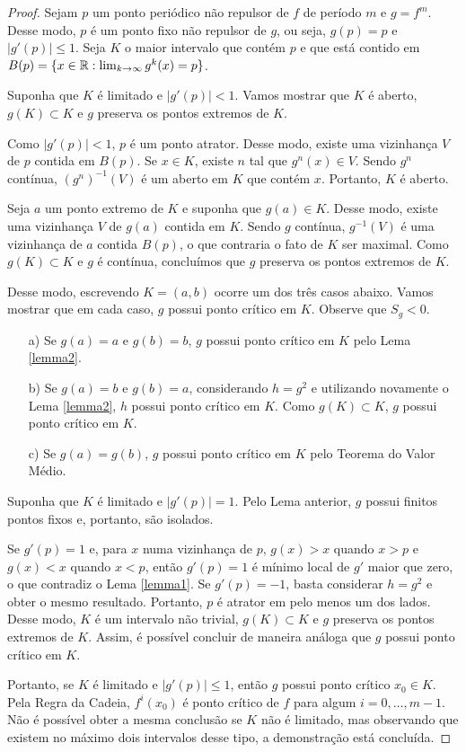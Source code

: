 \begin{proof}
Sejam $p$ um ponto periódico não repulsor de $f$ de período $m$ e $g = f^m$. Desse modo, $p$ é um ponto fixo não repulsor de $g$, ou seja, $g(p) = p$ e $|g'(p)| \leq 1$. Seja $K$ o maior intervalo que contém $p$ e que está contido em $B(p) = \{ x \in \mathbb{R} : \lim_{k \to \infty} g^k(x) = p \}$.

Suponha que $K$ é limitado e $|g'(p)| < 1$. Vamos mostrar que $K$ é aberto, $g(K) \subset K$ e $g$ preserva os pontos extremos de $K$.

Como $|g'(p)| < 1$, $p$ é um ponto atrator. Desse modo, existe uma vizinhança $V$ de $p$ contida em $B(p)$. Se $x \in K$, existe $n$ tal que $g^n(x) \in V$. Sendo $g^n$ contínua, $(g^n)^{-1}(V)$ é um aberto em $K$ que contém $x$. Portanto, $K$ é aberto.

Seja $a$ um ponto extremo de $K$ e suponha que $g(a) \in K$. Desse modo, existe uma vizinhança $V$ de $g(a)$ contida em $K$. Sendo $g$ contínua, $g^{-1}(V)$ é uma vizinhança de $a$ contida $B(p)$, o que contraria o fato de $K$ ser maximal. Como $g(K) \subset K$ e $g$ é contínua, concluímos que $g$ preserva os pontos extremos de $K$.

        Desse modo, escrevendo $K = (a, b)$ ocorre um dos três casos abaixo. Vamos mostrar que em cada caso, $g$ possui ponto crítico em $K$. Observe que $S_g < 0$.

\begin{enumerate}
\item[a)] Se $g(a) = a$ e $g(b) = b$, $g$ possui ponto crítico em $K$ pelo Lema \ref{lemma2}.
\item[b)] Se $g(a) = b$ e $g(b) = a$,  considerando $h = g^2$ e utilizando novamente o Lema \ref{lemma2}, $h$ possui ponto crítico em $K$. Como $g(K) \subset K$, $g$ possui ponto crítico em $K$.
\item[c)] Se $g(a) = g(b)$, $g$ possui ponto crítico em $K$ pelo Teorema do Valor Médio.
\end{enumerate}

Suponha que $K$ é limitado e $|g'(p)| = 1$. Pelo Lema anterior, $g$ possui finitos pontos fixos e, portanto, são isolados.

Se $g'(p) = 1$ e, para $x$ numa vizinhança de $p$, $g(x) > x$ quando $x > p$ e $g(x) < x$ quando $x < p$, então $g'(p) = 1$ é mínimo local de $g'$ maior que zero, o que contradiz o Lema \ref{lemma1}. Se $g'(p)=-1$, basta considerar $h=g^2$ e obter o mesmo resultado. Portanto, $p$ é atrator em pelo menos um dos lados. Desse modo, $K$ é um intervalo não trivial, $g(K) \subset K$ e $g$ preserva os pontos extremos de $K$. Assim, é possível concluir de maneira análoga que $g$ possui ponto crítico em $K$.

Portanto, se $K$ é limitado e $|g'(p)| \leq 1$, então $g$ possui ponto crítico $x_0 \in K$. Pela Regra da Cadeia, $f^i(x_0)$ é ponto crítico de $f$ para algum $i = 0, \dots, m-1$. Não é possível obter a mesma conclusão se $K$ não é limitado, mas observando que existem no máximo dois intervalos desse tipo, a demonstração está concluída.
\end{proof}

